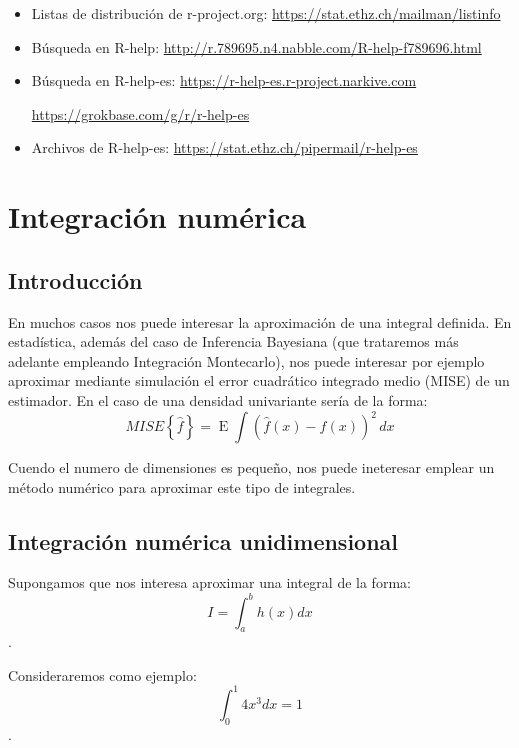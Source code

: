 \documentclass[]{book}
\theoremstyle{definition}
\theoremstyle{definition}
\theoremstyle{definition}
\theoremstyle{remark}
\begin{document}
\begin{itemize}
  \begin{itemize}
  \item
    Listas de distribución de r-project.org:
    \url{https://stat.ethz.ch/mailman/listinfo}
  \item
    Búsqueda en R-help:
    \url{http://r.789695.n4.nabble.com/R-help-f789696.html}
  \item
    Búsqueda en R-help-es: \url{https://r-help-es.r-project.narkive.com}

    \url{https://grokbase.com/g/r/r-help-es}
  \item
    Archivos de R-help-es:
    \url{https://stat.ethz.ch/pipermail/r-help-es}
  \end{itemize}
\end{itemize}

\chapter{Integración numérica}\label{integracion-numerica}

\section{Introducción}\label{introduccion-2}

En muchos casos nos puede interesar la aproximación de una integral
definida. En estadística, además del caso de Inferencia Bayesiana (que
trataremos más adelante empleando Integración Montecarlo), nos puede
interesar por ejemplo aproximar mediante simulación el error cuadrático
integrado medio (MISE) de un estimador. En el caso de una densidad
univariante sería de la forma:
\[MISE \left\{ \hat{f} \right\} = \operatorname{E}\int (\hat{f}(x)-f(x))^2 \, dx\]

Cuendo el numero de dimensiones es pequeño, nos puede ineteresar emplear
un método numérico para aproximar este tipo de integrales.

\section{Integración numérica
unidimensional}\label{integracion-numerica-unidimensional}

Supongamos que nos interesa aproximar una integral de la forma:
\[I=\int_{a}^{b}h\left(  x\right)dx\].

Consideraremos como ejemplo: \[\int_{0}^{1}4x^{3}dx=1\].
\end{document}
